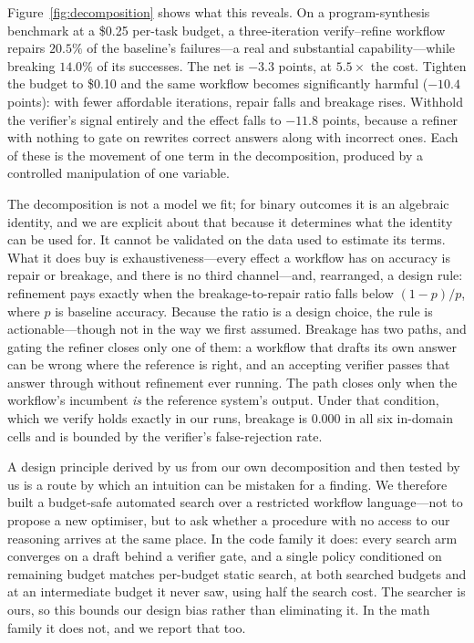 \documentclass{article}
\begin{document}
Figure~\ref{fig:decomposition} shows what this reveals. On a program-synthesis
benchmark at a \$0.25 per-task budget, a three-iteration verify--refine workflow
repairs $20.5\%$ of the baseline's failures---a real and substantial
capability---while breaking $14.0\%$ of its successes. The net is $-3.3$ points,
at $5.5\times$ the cost. Tighten the budget to \$0.10 and the same workflow
becomes significantly harmful ($-10.4$ points): with fewer affordable
iterations, repair falls and breakage rises. Withhold the verifier's signal
entirely and the effect falls to $-11.8$ points, because a refiner with nothing
to gate on rewrites correct answers along with incorrect ones. Each of these is
the movement of one term in the decomposition, produced by a controlled
manipulation of one variable.

The decomposition is not a model we fit; for binary outcomes it is an algebraic
identity, and we are explicit about that because it determines what the identity
can be used for. It cannot be validated on the data used to estimate its terms.
What it does buy is exhaustiveness---every effect a workflow has on accuracy is
repair or breakage, and there is no third channel---and, rearranged, a design
rule: refinement pays exactly when the breakage-to-repair ratio falls below
$(1-p)/p$, where $p$ is baseline accuracy. Because the ratio is a design choice,
the rule is actionable---though not in the way we first assumed. Breakage has
two paths, and gating the refiner closes only one of them: a workflow that
drafts its own answer can be wrong where the reference is right, and an
accepting verifier passes that answer through without refinement ever running.
The path closes only when the workflow's incumbent \emph{is} the reference
system's output. Under that condition, which we verify holds exactly in our
runs, breakage is $0.000$ in all six in-domain cells and is bounded by the
verifier's false-rejection rate.

A design principle derived by us from our own decomposition and then tested by
us is a route by which an intuition can be mistaken for a finding. We therefore
built a budget-safe automated search over a restricted workflow language---not
to propose a new optimiser, but to ask whether a procedure with no access to our
reasoning arrives at the same place. In the code family it does: every search
arm converges on a draft behind a verifier gate, and a single policy conditioned
on remaining budget matches per-budget static search, at both searched budgets
and at an intermediate budget it never saw, using half the search cost. The
searcher is ours, so this bounds our design bias rather than eliminating it. In the math family it does not, and we report that too.
\end{document}
